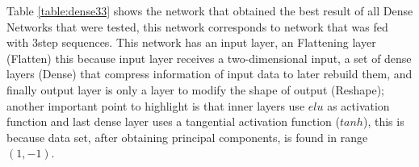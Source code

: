 \vspace{5mm} %

Table \ref{table:dense33} shows the network that obtained the best result of all Dense Networks that were tested, this network corresponds to network that was fed with 3\-step sequences. This network has an input layer, an Flattening layer (Flatten) this because input layer receives a two-dimensional input, a set of dense layers (Dense) that compress information of input data to later rebuild them, and finally output layer is only a layer to modify the shape of output (Reshape); another important point to highlight is that inner layers use $elu$ as activation function and last dense layer uses a tangential activation function ($tanh$), this is because data set, after obtaining principal components, is found in range $(1, -1)$.

